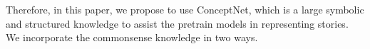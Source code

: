 

Therefore, in this paper, we propose to use ConceptNet\cite{speer2017conceptnet}, 
which is a large symbolic and structured knowledge to assist the 
pretrain models in representing stories. 
We incorporate the commonsense knowledge in two ways.

